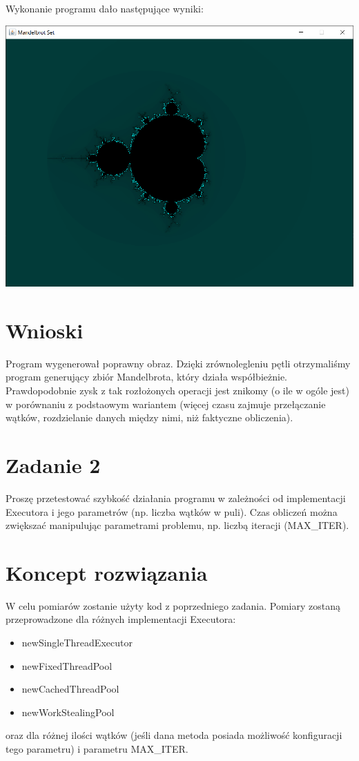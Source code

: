 \documentclass[12pt]{article}
\begin{document}
\newpage
\noindent
Wykonanie programu dało następujące wyniki:
\begin{center}
\centering
    \includegraphics[scale=0.8]{mandel1.png}
\end{center}


\section{Wnioski}
Program wygenerował poprawny obraz. Dzięki zrównolegleniu pętli otrzymaliśmy program generujący zbiór Mandelbrota, który działa współbieżnie. Prawdopodobnie zysk z tak rozłożonych operacji jest znikomy (o ile w ogóle jest) w porównaniu z podstaowym wariantem (więcej czasu zajmuje przełączanie wątków, rozdzielanie danych między nimi, niż faktyczne obliczenia).


\newpage
\section{Zadanie 2}
Proszę przetestować szybkość działania programu w zależności od implementacji Executora i jego parametrów (np. liczba wątków w puli). Czas obliczeń można zwiększać manipulując parametrami problemu, np. liczbą iteracji (MAX\_ITER).


\section{Koncept rozwiązania}
W celu pomiarów zostanie użyty kod z poprzedniego zadania. Pomiary zostaną przeprowadzone dla różnych implementacji Executora:
\begin{itemize}
    \item newSingleThreadExecutor
    \item newFixedThreadPool
    \item newCachedThreadPool
    \item newWorkStealingPool
\end{itemize}
oraz dla różnej ilości wątków (jeśli dana metoda posiada możliwość konfiguracji tego parametru) i parametru MAX\_ITER.
\end{document}
